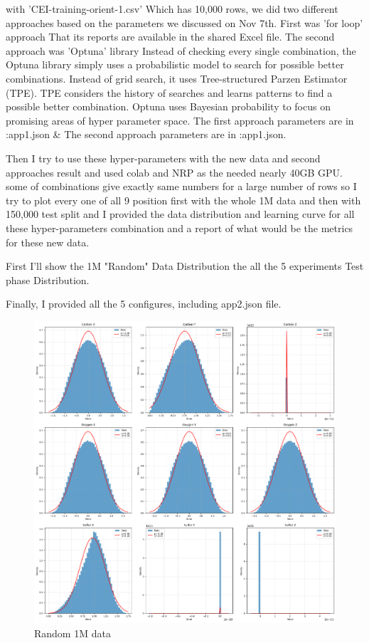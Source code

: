 \documentclass{article}
\begin{document}
\noindent with 'CEI-training-orient-1.csv'
Which has 10,000 rows, we did
two different approaches based on
the parameters we discussed on Nov 7th.
First was 'for loop' approach
That its reports are available in the shared
Excel file.
The second approach was 'Optuna' library
Instead of checking every single combination,
the Optuna library simply uses
a probabilistic model to search for possible better
combinations. Instead of grid search,
it uses Tree-structured Parzen Estimator (TPE).
TPE considers the history of searches
and learns patterns to find a possible better
combination. Optuna uses Bayesian probability
to focus on promising areas of hyper parameter
space.
The first approach parameters are in :app1.json \& The second approach parameters are in :app1.json.

Then I try to use these hyper-parameters with the new data and second approaches result and used colab and NRP as the needed nearly 40GB GPU. some of combinations give exactly same numbers for a large number of rows so I try to plot every one of all 9 position first with the whole 1M data and then with 150,000 test split and I provided the data distribution and learning curve for all these hyper-parameters combination and a report of what would be the metrics for these new data.

First I'll show the 1M "Random" Data Distribution the all the 5 experiments Test phase Distribution.

Finally, I provided all the 5 configures, including app2.json file. 

\begin{figure}[H]
   \centering
   \includegraphics[width=1.2\textwidth]{random.png}
   \caption{Random 1M data}
\end{figure}
\end{document}
